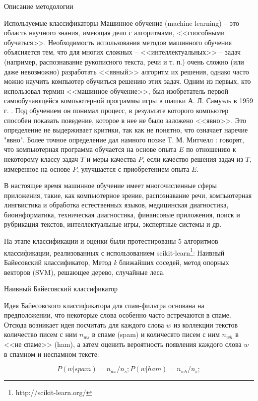 \begin{section}{Описание методологии}
\begin{subsection}{Используемые классификаторы}
    Машинное обучение (machine learning) – это область научного знания, имеющая дело с алгоритмами, <<способными обучаться>>. Необходимость использования методов машинного обучения объясняется тем, что для многих сложных – <<интеллектуальных>> – задач (например, распознавание рукописного текста, речи и т. п.) очень сложно (или даже невозможно) разработать <<явный>> алгоритм их решения, однако часто можно научить компьютер обучиться решению этих задач. Одним из первых, кто использовал термин <<машинное обучение>>, был изобретатель первой самообучающейся компьютерной программы игры в шашки А. Л. Самуэль в 1959 г. \cite{Samuel}. Под обучением он понимал процесс, в результате которого компьютер способен показать поведение, которое в нее не было заложено <<явно>>. Это определение не выдерживает критики, так как не понятно, что означает наречие "явно". Более точное определение дал намного позже Т. М. Митчелл \cite{Mitchell}: говорят, что компьютерная программа обучается на основе опыта $E$ по отношению к некоторому классу задач $T$ и меры качества $P$, если качество решения задач из $T$, измеренное на основе $P$, улучшается с приобретением опыта $E$.

    В настоящее время машинное обучение имеет многочисленные сферы приложения, такие, как компьютерное зрение, распознавание речи, компьютерная лингвистика и обработка естественных языков, медицинская диагностика, биоинформатика, техническая диагностика, финансовые приложения, поиск и рубрикация текстов, интеллектуальные игры, экспертные системы и др.


    На этапе классификации и оценки были протестированы 5 алгоритмов классификации, реализованных с использованием scikit-learn\footnote{http://scikit-learn.org/}: Наивный Байесовский классификатор,
    Метод \textit{k} ближайших соседей, метод опорных векторов (SVM), решающее дерево, случайные леса.

    \begin{subsubsection}{Наивный Байесовский классификатор}

Идея Байесовского классификатора для спам-фильтра основана на предположении,
что некоторые слова особенно часто встречаются в спаме. Отсюда возникает идея посчитать для каждого слова $w$ из коллекции текстов количество писем с ним $n_{ws}$
в спаме (spam) и количесвто писем с ним $n_{wh}$ в <<не спаме>> (ham), а затем оценить вероятность появления каждого слова $w$ в спамном и неспамном тексте:

\begin{equation}
  P(w|spam) = n_{ws}/n_s; P(w|ham) = n_{wh}/n_s;
\end{equation}


\end{subsubsection}
\end{subsection}
\end{section}
